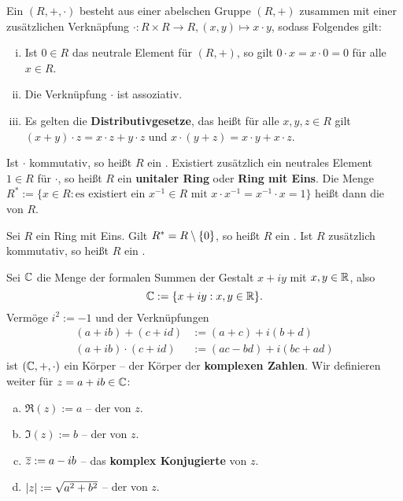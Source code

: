 \begin{definition}[Ring]
	\label{def:I.4.5}
	Ein  $(R,+,\cdot)$ besteht aus einer abelschen Gruppe $(R,+)$ zusammen mit einer zusätzlichen Verknäpfung $\cdot \colon R \times R \rightarrow R, (x,y) \mapsto x \cdot y$, sodass Folgendes gilt:
	\begin{enumerate}[(i)]
		\item Ist $0 \in R$ das neutrale Element für $(R,+)$, so gilt $0 \cdot x = x \cdot 0 = 0$ für alle $x \in R$.
		\item Die Verknüpfung $\cdot$ ist assoziativ.
		\item Es gelten die \textbf{Distributivgesetze}, das heißt für alle $x,y,z \in R$ gilt $(x+y) \cdot z = x\cdot z + y \cdot z$ und $x\cdot(y+z) = x \cdot y + x \cdot z$. 
	\end{enumerate}
	Ist $\cdot$ kommutativ, so heißt $R$ ein .
	Existiert zusätzlich ein neutrales Element $1 \in R$ für $\cdot$, so heißt $R$ ein \textbf{unitaler Ring} oder \textbf{Ring mit Eins}.
	Die Menge $R^* := \{x \in R : \text{es existiert ein } x^{-1} \in R \text{ mit } x \cdot x^{-1} = x^{-1} \cdot x = 1\}$ heißt dann die  von $R$.   
\end{definition}

\setcounter{satz}{6}
\begin{definition}
	\label{def:I.4.7}
	Sei $R$ ein Ring mit Eins.
	Gilt $R^* = R \setminus \{0\}$, so heißt $R$ ein .
	Ist $R$ zusätzlich kommutativ, so heißt $R$ ein .
\end{definition}

\setcounter{satz}{9}
\begin{definition}
	\label{def:I.4.10}
	Sei $\mathbb{C}$ die Menge der formalen Summen der Gestalt $x+iy$ mit $x,y \in \mathbb{R}$, also
	\[
		\mathbb{C}:= \{x+iy : x,y \in \mathbb{R}\}.
	\]
	Vermöge $i^2 := -1$ und der Verknüpfungen
	\begin{align*}
		(a+ib) + (c+id) &:= (a+c) + i(b+d) \\
		(a+ib) \cdot (c+id) &:= (ac-bd) + i(bc+ad)
	\end{align*}
	ist $(\mathbb{C},+,\cdot)$ ein Körper -- der Körper der \textbf{komplexen Zahlen}. 
	Wir definieren weiter für $z = a+ib \in \mathbb{C}$:
	\begin{enumerate}[a)]
		\item $\Re(z) := a$ -- der  von $z$.
		\item $\Im(z) := b$ -- der  von $z$.
		\item $\overline{z} := a-ib$ -- das \textbf{komplex Konjugierte} von $z$. 
		\item $\left\lvert z\right\rvert := \sqrt{a^2+b^2}$ -- der  von $z$.
	\end{enumerate}
\end{definition}

